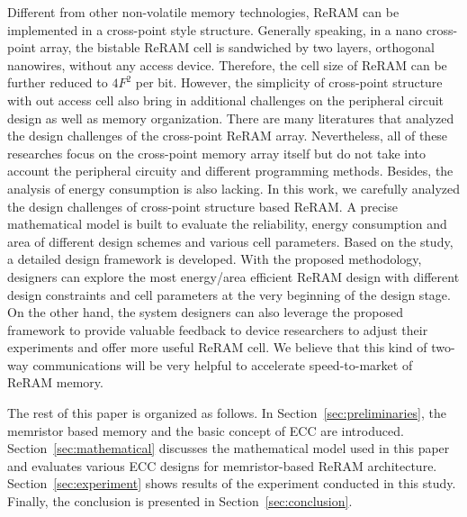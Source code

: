 Different from other non-volatile memory technologies, ReRAM can be implemented in a cross-point style structure. Generally speaking, in a nano cross-point array, the bistable ReRAM cell is sandwiched by two layers, orthogonal nanowires, without any access device. Therefore, the cell size of ReRAM can be further reduced to $4F^2$ per bit. However, the simplicity of cross-point structure with out access cell also bring in additional challenges on the peripheral circuit design as well as memory organization. There are many literatures that analyzed the design challenges of the cross-point ReRAM array. Nevertheless, all of these researches focus on the cross-point memory array itself but do not take into account the peripheral circuity and different programming methods. Besides, the analysis of energy consumption is also lacking. In this work, we carefully analyzed the design challenges of cross-point structure based ReRAM. A precise mathematical model is built to evaluate the reliability, energy consumption and area of different design schemes and various cell parameters. Based on the study, a detailed design framework is developed. With the proposed methodology, designers can explore the most energy/area efficient ReRAM design with different design constraints and cell parameters at the very beginning of the design stage. On the other hand, the system designers can also leverage the proposed framework to provide valuable feedback to device researchers to adjust their experiments and offer more useful ReRAM cell. We believe that this kind of two-way communications will be very helpful to accelerate speed-to-market of ReRAM memory.

The rest of this paper is organized as follows. In
Section~\ref{sec:preliminaries}, the memristor based memory and the basic
concept of ECC are introduced. Section~\ref{sec:mathematical} discusses the mathematical model used in this paper and evaluates various ECC
designs for memristor-based ReRAM architecture. Section~\ref{sec:experiment} shows results of the experiment conducted in this study. Finally, the conclusion is presented in Section~\ref{sec:conclusion}.

